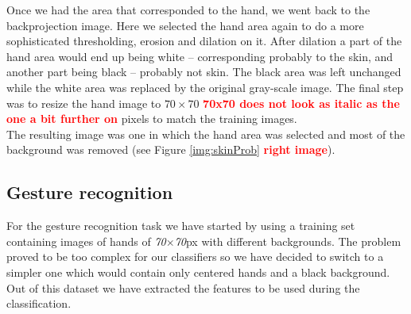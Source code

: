 \documentclass[a4paper, 11pt, twocolumn]{article}
\newcommand{\todo}[1]{\textcolor{red}{\textbf{#1}}}
\begin{document}
       \hspace*{10px}Once we had the area that corresponded to the hand, we went back to the backprojection image. Here we selected the hand area again to do a more sophisticated thresholding, erosion and dilation on it. After dilation a part of the hand area would end up being white -- corresponding probably to the skin, and another part being black -- probably not skin. The black area was left unchanged while the white area was replaced by the original gray-scale image. The final step was to resize the hand image to \emph{$70\times 70$} \todo{70x70 does not look as italic as the one a bit further on} pixels to match the training images.\\
		\hspace*{10px}The resulting image was one in which the hand area was selected and most of the background was removed (see Figure \ref{img:skinProb} \todo{right image}).
        \subsection{Gesture recognition}
		For the gesture recognition task we have started by using a training set containing images of hands of \emph{70$\times$70}px with different backgrounds. The problem proved to be too complex for our classifiers so we have decided to switch to a simpler one which would contain only centered hands and a black background.\\ 
		\hspace*{10px}Out of this dataset we have extracted the features to be used during the classification.
		\label{sec:Meth_clssifyHands}
\end{document}
